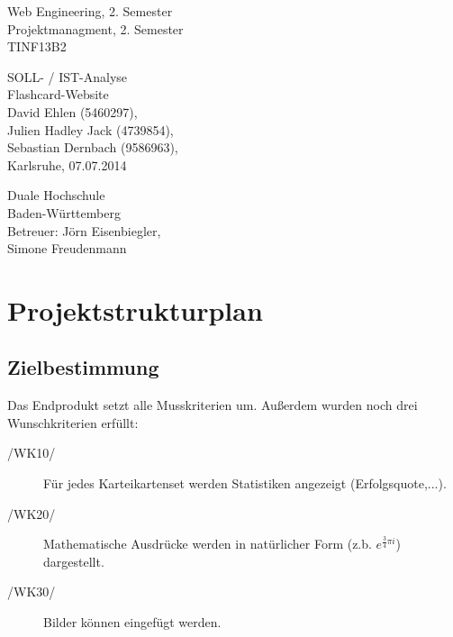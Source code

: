 \documentclass{article}
\newcommand{\appname}{Flashcard-Website}
\begin{document}
\begin{titlepage}
    \large
    \begin{flushleft}
        Web Engineering, 2. Semester \\
        Projektmanagment, 2. Semester \\
        TINF13B2
    \end{flushleft}
    
    \vfill

    \begin{center}
        \Huge SOLL- / IST-Analyse\\
        \Large \appname \\
        \vspace{1cm}
        \normalsize David Ehlen (5460297),\\
        Julien Hadley Jack (4739854), \\
        Sebastian Dernbach (9586963), \\
        \vspace\medskipamount
        \vspace\medskipamount
        Karlsruhe, 07.07.2014
    \end{center}
    
    \vfill
    
    \begin{flushright}
        Duale Hochschule \\
        Baden-Württemberg \\
        \vspace\medskipamount
        Betreuer: Jörn Eisenbiegler,\\
        Simone Freudenmann
    \end{flushright}
\end{titlepage}

\newpage

\pagestyle{empty}
\tableofcontents
\cleardoublepage

\setcounter{page}{1}
\pagestyle{plain}
\setcounter{page}{1}

\section{Projektstrukturplan}
\subsection{Zielbestimmung}
Das Endprodukt setzt alle Musskriterien um. Außerdem wurden noch drei Wunschkriterien erfüllt:
\begin{description}
	\item[/WK10/] Für jedes Karteikartenset werden Statistiken angezeigt (Erfolgsquote,...).
	\item[/WK20/] Mathematische Ausdrücke werden in natürlicher Form (z.b. \( e^{\frac{3}{4}\pi i}\)) dargestellt.
	\item[/WK30/]\label{bilder} Bilder können eingefügt werden.
\end{description}
\end{document}
